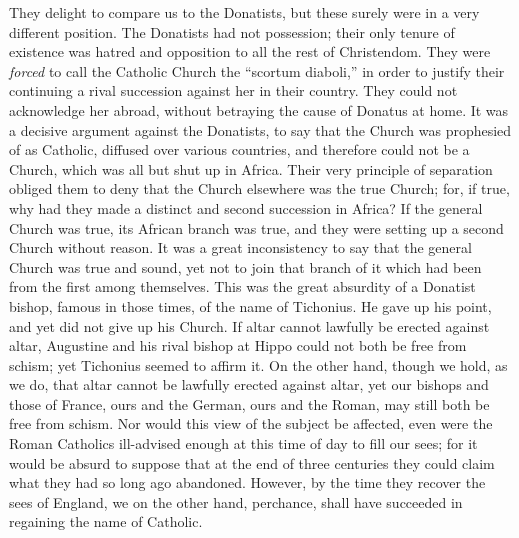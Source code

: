 They delight to compare us to the Donatists, but
these surely were in a very different position. The Donatists had
not possession; their only tenure of existence was hatred and
opposition to all the rest of Christendom. They were \emph{forced} to
call the Catholic Church the ``scortum diaboli,'' in order to
justify their continuing a rival succession against her in their
country. They could not acknowledge her abroad, without betraying the
cause of Donatus at home. It was a decisive argument against the
Donatists, to say that the Church was prophesied of as Catholic,
diffused over various countries, and therefore could not be a Church,
which was all but shut up in Africa. Their very principle of
separation obliged them to deny that the Church elsewhere was the true
Church; for, if true, why had they made a distinct and second
succession in Africa? If the general Church was true, its African
branch was true, and they were setting up a second Church without
reason. It was a great inconsistency to say that the general Church
was true and sound, yet not to join that branch of it which had been
from the first among themselves. This was the great absurdity of a
Donatist bishop, famous in those times, of the name of Tichonius. He
gave up his point, and yet did not give up his Church. If altar cannot
lawfully be erected against altar, Augustine and his rival bishop at
Hippo could not both be free from schism; yet Tichonius seemed to
affirm it. On the other hand, though we hold, as we do, that altar
cannot be lawfully erected against altar, yet our bishops and those of
France, ours and the German, ours and the Roman, may still both be
free from schism. Nor would this view of the subject be affected, even
were the Roman Catholics ill-advised enough at this time of day to
fill our sees; for it would be absurd to suppose that at the end of
three centuries they could claim what they had so long ago abandoned. However, by the time they recover the sees of England, we
on the other hand, perchance, shall have succeeded in regaining the
name of Catholic.

